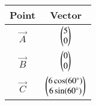 \begin{tabular}{|c|c|}
\hline
Point & Vector \\
\hline
$\vec{A}$ & $\begin{pmatrix}5 \\ 0\end{pmatrix}$ \\
\hline
$\vec{B}$ & $\begin{pmatrix}0 \\ 0\end{pmatrix}$ \\
\hline
	$\vec{C}$ & $\begin{pmatrix}6\cos(60^\circ) \\ 6\sin(60^\circ) \end{pmatrix}$ \\
\hline
\end{tabular}
